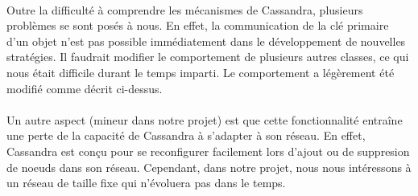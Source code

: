 \documentclass[12pt]{article}
\begin{document}
\paragraph{}Outre la difficulté à comprendre les mécanismes de Cassandra, plusieurs problèmes se sont posés à nous. En effet, la communication de la clé primaire d'un objet n'est pas possible immédiatement dans le développement de nouvelles stratégies. Il faudrait modifier le comportement de plusieurs autres classes, ce qui nous était difficile durant le temps imparti. Le comportement a légèrement été modifié comme décrit ci-dessus.

\paragraph{}Un autre aspect (mineur dans notre projet) est que cette fonctionnalité entraîne une perte de la capacité de Cassandra à s'adapter à son réseau. En effet, Cassandra est conçu pour se reconfigurer facilement lors d'ajout ou de suppresion de noeuds dans son réseau. Cependant, dans notre projet, nous nous intéressons à un réseau de taille fixe qui n'évoluera pas dans le temps.
\end{document}
